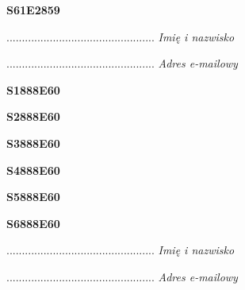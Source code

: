 \begin{turn}{90}\huge \textbf{S61E2859}\end{turn}

\begin{turn}{90}\begin{minipage}{\linewidth} \vspace{20mm} ................................................  \textit{Imię i nazwisko}\end{minipage}\end{turn}

\begin{turn}{90}\begin{minipage}{\linewidth} \vspace{20mm} ................................................  \textit{Adres e-mailowy}\end{minipage}\end{turn}

\begin{turn}{90}\huge \textbf{S1888E60}\end{turn}

\begin{turn}{90}\huge \textbf{S2888E60}\end{turn}

\begin{turn}{90}\huge \textbf{S3888E60}\end{turn}

\begin{turn}{90}\huge \textbf{S4888E60}\end{turn}

\begin{turn}{90}\huge \textbf{S5888E60}\end{turn}

\begin{turn}{90}\huge \textbf{S6888E60}\end{turn}

\begin{turn}{90}\begin{minipage}{\linewidth} \vspace{20mm} ................................................  \textit{Imię i nazwisko}\end{minipage}\end{turn}

\begin{turn}{90}\begin{minipage}{\linewidth} \vspace{20mm} ................................................  \textit{Adres e-mailowy}\end{minipage}\end{turn}

